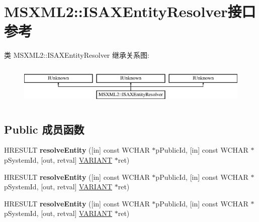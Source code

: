 \hypertarget{interface_m_s_x_m_l2_1_1_i_s_a_x_entity_resolver}{}\section{M\+S\+X\+M\+L2\+:\+:I\+S\+A\+X\+Entity\+Resolver接口 参考}
\label{interface_m_s_x_m_l2_1_1_i_s_a_x_entity_resolver}
类 M\+S\+X\+M\+L2\+:\+:I\+S\+A\+X\+Entity\+Resolver 继承关系图\+:\begin{figure}[H]
\begin{center}
\leavevmode
\includegraphics[height=1.975309cm]{interface_m_s_x_m_l2_1_1_i_s_a_x_entity_resolver}
\end{center}
\end{figure}
\subsection*{Public 成员函数}
\begin{DoxyCompactItemize}
\item 
\mbox{\label{interface_m_s_x_m_l2_1_1_i_s_a_x_entity_resolver_ab11dfeec58af14de1af2c7152f278945}} 
H\+R\+E\+S\+U\+LT {\bfseries resolve\+Entity} (\mbox{[}in\mbox{]} const W\+C\+H\+AR $\ast$p\+Public\+Id, \mbox{[}in\mbox{]} const W\+C\+H\+AR $\ast$p\+System\+Id, \mbox{[}out, retval\mbox{]} \hyperlink{structtag_v_a_r_i_a_n_t}{V\+A\+R\+I\+A\+NT} $\ast$ret)
\item 
\mbox{\label{interface_m_s_x_m_l2_1_1_i_s_a_x_entity_resolver_ab11dfeec58af14de1af2c7152f278945}} 
H\+R\+E\+S\+U\+LT {\bfseries resolve\+Entity} (\mbox{[}in\mbox{]} const W\+C\+H\+AR $\ast$p\+Public\+Id, \mbox{[}in\mbox{]} const W\+C\+H\+AR $\ast$p\+System\+Id, \mbox{[}out, retval\mbox{]} \hyperlink{structtag_v_a_r_i_a_n_t}{V\+A\+R\+I\+A\+NT} $\ast$ret)
\item 
\mbox{\label{interface_m_s_x_m_l2_1_1_i_s_a_x_entity_resolver_ab11dfeec58af14de1af2c7152f278945}} 
H\+R\+E\+S\+U\+LT {\bfseries resolve\+Entity} (\mbox{[}in\mbox{]} const W\+C\+H\+AR $\ast$p\+Public\+Id, \mbox{[}in\mbox{]} const W\+C\+H\+AR $\ast$p\+System\+Id, \mbox{[}out, retval\mbox{]} \hyperlink{structtag_v_a_r_i_a_n_t}{V\+A\+R\+I\+A\+NT} $\ast$ret)
\end{DoxyCompactItemize}
